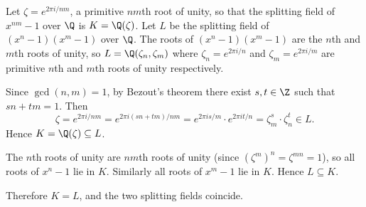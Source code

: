 \begin{solution}
  Let $\zeta = e^{2\pi i / nm}$, a primitive $nm$th root of unity, so that the splitting field of $x^{nm} - 1$ over $\Q$ is $K = \Q(\zeta)$. Let $L$ be the splitting field of $(x^n - 1)(x^m - 1)$ over $\Q$. The roots of $(x^n-1)(x^m-1)$ are the $n$th and $m$th roots of unity, so $L = \Q(\zeta_n, \zeta_m)$ where $\zeta_n = e^{2\pi i/n}$ and $\zeta_m = e^{2\pi i/m}$ are primitive $n$th and $m$th roots of unity respectively.

  Since $\gcd(n,m) = 1$, by Bezout's theorem there exist $s, t \in \Z$ such that $sn + tm = 1$. Then
  \[%
    \zeta = e^{2\pi i / nm} = e^{2\pi i (sn + tm)/nm} = e^{2\pi i s/m} \cdot e^{2\pi i t/n} = \zeta_m^s \cdot \zeta_n^t \in L.
  \]%
  Hence $K = \Q(\zeta) \subseteq L$.

  The $n$th roots of unity are $nm$th roots of unity (since $(\zeta^m)^n = \zeta^{mn} = 1$), so all roots of $x^n - 1$ lie in $K$. Similarly all roots of $x^m - 1$ lie in $K$. Hence $L \subseteq K$.

  Therefore $K = L$, and the two splitting fields coincide.
\end{solution}
